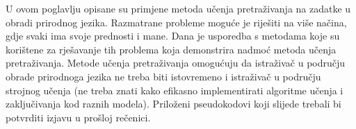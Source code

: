 U ovom poglavlju opisane su primjene metoda učenja pretraživanja na zadatke u
obradi prirodnog jezika. Razmatrane probleme moguće je riješiti na više načina,
gdje svaki ima svoje prednosti i mane. Dana je usporedba s metodama koje su
korištene za rješavanje tih problema koja demonstrira nadmoć metoda učenja
pretraživanja. Metode učenja pretraživanja omogućuju da istraživač u području
obrade prirodnoga jezika ne treba biti istovremeno i istraživač u području
strojnog učenja (ne treba znati kako efikasno implementirati algoritme učenja i
zaključivanja kod raznih modela). Priloženi pseudokodovi koji slijede trebali bi
potvrditi izjavu u prošloj rečenici.
